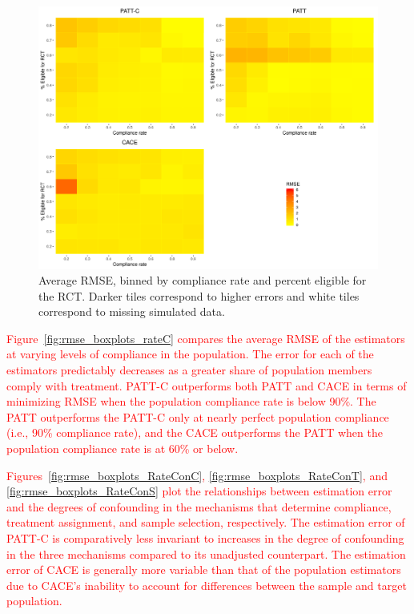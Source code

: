 \documentclass[hidelinks,12pt]{article}
\begin{document}
\begin{figure}[htbp]
	\begin{center}
		\includegraphics[width = 1\textwidth]{rmse_ratec_rates.png}
		\caption{Average RMSE, binned by compliance rate and percent eligible for the RCT. Darker tiles correspond to higher errors and white tiles correspond to missing simulated data.\label{fig:rmse_ratec_rates}}
	\end{center}
\end{figure}

\textcolor{red}{Figure~\ref{fig:rmse_boxplots_rateC} compares the average RMSE of the estimators at varying levels of compliance in the population. The error for each of the estimators predictably decreases as a greater share of population members comply with treatment. PATT-C outperforms both PATT and CACE in terms of minimizing RMSE when the population compliance rate is below 90\%. The PATT outperforms the PATT-C only at nearly perfect population compliance (i.e., 90\% compliance rate), and the CACE outperforms the PATT when the population compliance rate is at 60\% or below.} 

\textcolor{red}{Figures~\ref{fig:rmse_boxplots_RateConC}, \ref{fig:rmse_boxplots_RateConT}, and \ref{fig:rmse_boxplots_RateConS} plot the relationships between estimation error and the degrees of confounding in the mechanisms that determine compliance, treatment assignment, and sample selection, respectively. The estimation error of PATT-C is comparatively less invariant to increases in the degree of confounding in the three mechanisms compared to its unadjusted counterpart. The estimation error of CACE is generally more variable than that of the population estimators due to CACE's inability to account for differences between the sample and target population.}
\end{document}
